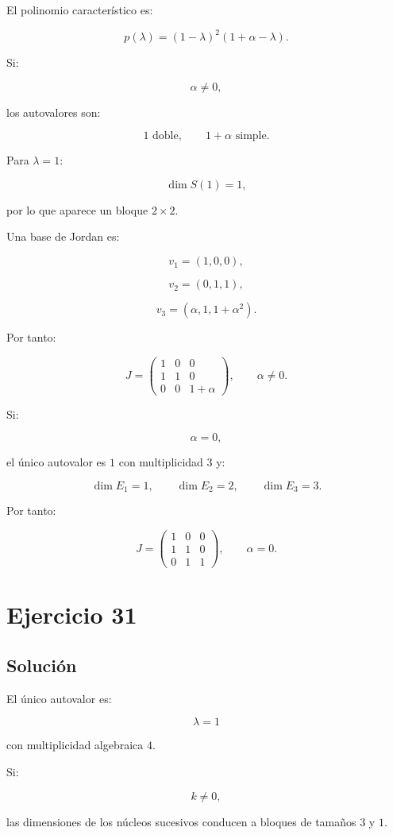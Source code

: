 \documentclass[11pt,a4paper]{article}
\begin{document}
El polinomio característico es:

\[
p(\lambda)
=
(1-\lambda)^2(1+\alpha-\lambda).
\]

Si:

\[
\alpha\neq0,
\]

los autovalores son:

\[
1\text{ doble},
\qquad
1+\alpha\text{ simple}.
\]

Para $\lambda=1$:

\[
\dim S(1)=1,
\]

por lo que aparece un bloque $2\times2$.

Una base de Jordan es:

\[
v_1=(1,0,0),
\]

\[
v_2=(0,1,1),
\]

\[
v_3=(\alpha,1,1+\alpha^2).
\]

Por tanto:

\[
\boxed{
J=
\begin{pmatrix}
1&0&0\\
1&1&0\\
0&0&1+\alpha
\end{pmatrix},
\qquad
\alpha\neq0.
}
\]

Si:

\[
\alpha=0,
\]

el único autovalor es $1$ con multiplicidad $3$ y:

\[
\dim E_1=1,\qquad
\dim E_2=2,\qquad
\dim E_3=3.
\]

Por tanto:

\[
\boxed{
J=
\begin{pmatrix}
1&0&0\\
1&1&0\\
0&1&1
\end{pmatrix},
\qquad
\alpha=0.
}
\]

\section{Ejercicio 31}
\subsection{Solución}

El único autovalor es:

\[
\lambda=1
\]

con multiplicidad algebraica $4$.

Si:

\[
k\neq0,
\]

las dimensiones de los núcleos sucesivos conducen a bloques de tamaños $3$ y $1$.
\end{document}
